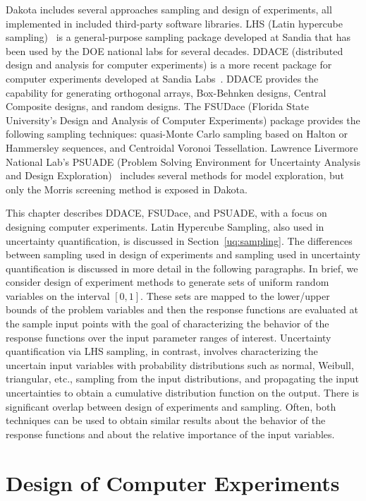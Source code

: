 Dakota includes several approaches sampling and design of experiments,
all implemented in included third-party software libraries.  LHS
(Latin hypercube sampling)~\cite{Swi04} is a general-purpose sampling
package developed at Sandia that has been used by the DOE national
labs for several decades. DDACE (distributed design and analysis for
computer experiments) is a more recent package for computer
experiments developed at Sandia Labs~\cite{TonXX}. DDACE provides the
capability for generating orthogonal arrays, Box-Behnken designs,
Central Composite designs, and random designs.  The FSUDace (Florida
State University's Design and Analysis of Computer Experiments)
package provides the following sampling techniques: quasi-Monte Carlo
sampling based on Halton or Hammersley sequences, and Centroidal
Voronoi Tessellation.  Lawrence Livermore National Lab's PSUADE
(Problem Solving Environment for Uncertainty Analysis and Design
Exploration)~\cite{Ton05} includes several methods for model
exploration, but only the Morris screening method is exposed in
Dakota.

This chapter describes DDACE, FSUDace, and PSUADE, with a focus on
designing computer experiments. Latin Hypercube Sampling, also used in
uncertainty quantification, is discussed in Section~\ref{uq:sampling}.
The differences between sampling used in design of experiments and
sampling used in uncertainty quantification is discussed in more
detail in the following paragraphs. In brief, we consider design of
experiment methods to generate sets of uniform random variables on the
interval $[0,1]$. These sets are mapped to the lower/upper bounds of
the problem variables and then the response functions are evaluated at
the sample input points with the goal of characterizing the behavior
of the response functions over the input parameter ranges of
interest. Uncertainty quantification via LHS sampling, in contrast,
involves characterizing the uncertain input variables with probability
distributions such as normal, Weibull, triangular, etc., sampling from
the input distributions, and propagating the input uncertainties to
obtain a cumulative distribution function on the output. There is
significant overlap between design of experiments and sampling. Often,
both techniques can be used to obtain similar results about the
behavior of the response functions and about the relative importance
of the input variables.

\section{Design of Computer Experiments}\label{dace:background}

